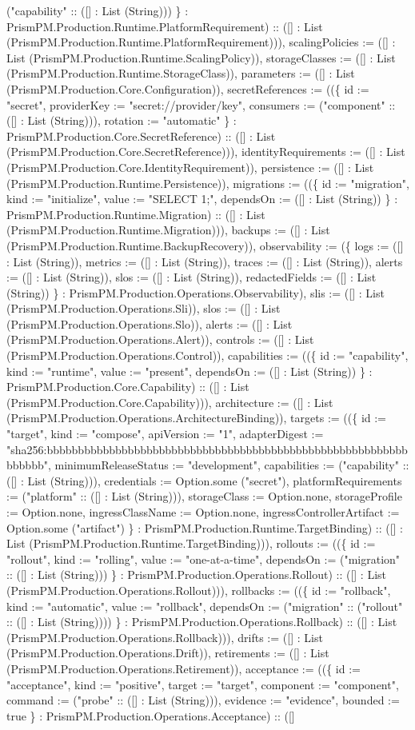 \documentclass[11pt]{article}
\begin{document}
("capability" :: ([] : List (String))) \} : PrismPM.Production.Runtime.PlatformRequirement) :: ([] : List (PrismPM.Production.Runtime.PlatformRequirement))), scalingPolicies := ([] : List (PrismPM.Production.Runtime.ScalingPolicy)), storageClasses := ([] : List (PrismPM.Production.Runtime.StorageClass)), parameters := ([] : List (PrismPM.Production.Core.Configuration)), secretReferences := ((\{ id := "secret", providerKey := "secret://provider/key", consumers := ("component" :: ([] : List (String))), rotation := "automatic" \} : PrismPM.Production.Core.SecretReference) :: ([] : List (PrismPM.Production.Core.SecretReference))), identityRequirements := ([] : List (PrismPM.Production.Core.IdentityRequirement)), persistence := ([] : List (PrismPM.Production.Runtime.Persistence)), migrations := ((\{ id := "migration", kind := "initialize", value := "SELECT 1;", dependsOn := ([] : List (String)) \} : PrismPM.Production.Runtime.Migration) :: ([] : List (PrismPM.Production.Runtime.Migration))), backups := ([] : List (PrismPM.Production.Runtime.BackupRecovery)), observability := (\{ logs := ([] : List (String)), metrics := ([] : List (String)), traces := ([] : List (String)), alerts := ([] : List (String)), slos := ([] : List (String)), redactedFields := ([] : List (String)) \} : PrismPM.Production.Operations.Observability), slis := ([] : List (PrismPM.Production.Operations.Sli)), slos := ([] : List (PrismPM.Production.Operations.Slo)), alerts := ([] : List (PrismPM.Production.Operations.Alert)), controls := ([] : List (PrismPM.Production.Operations.Control)), capabilities := ((\{ id := "capability", kind := "runtime", value := "present", dependsOn := ([] : List (String)) \} : PrismPM.Production.Core.Capability) :: ([] : List (PrismPM.Production.Core.Capability))), architecture := ([] : List (PrismPM.Production.Operations.ArchitectureBinding)), targets := ((\{ id := "target", kind := "compose", apiVersion := "1", adapterDigest := "sha256:bbbbbbbbbbbbbbbbbbbbbbbbbbbbbbbbbbbbbbbbbbbbbbbbbbbbbbbbbbbbbbbb", minimumReleaseStatus := "development", capabilities := ("capability" :: ([] : List (String))), credentials := Option.some ("secret"), platformRequirements := ("platform" :: ([] : List (String))), storageClass := Option.none, storageProfile := Option.none, ingressClassName := Option.none, ingressControllerArtifact := Option.some ("artifact") \} : PrismPM.Production.Runtime.TargetBinding) :: ([] : List (PrismPM.Production.Runtime.TargetBinding))), rollouts := ((\{ id := "rollout", kind := "rolling", value := "one-at-a-time", dependsOn := ("migration" :: ([] : List (String))) \} : PrismPM.Production.Operations.Rollout) :: ([] : List (PrismPM.Production.Operations.Rollout))), rollbacks := ((\{ id := "rollback", kind := "automatic", value := "rollback", dependsOn := ("migration" :: ("rollout" :: ([] : List (String)))) \} : PrismPM.Production.Operations.Rollback) :: ([] : List (PrismPM.Production.Operations.Rollback))), drifts := ([] : List (PrismPM.Production.Operations.Drift)), retirements := ([] : List (PrismPM.Production.Operations.Retirement)), acceptance := ((\{ id := "acceptance", kind := "positive", target := "target", component := "component", command := ("probe" :: ([] : List (String))), evidence := "evidence", bounded := true \} : PrismPM.Production.Operations.Acceptance) :: ([] 
\end{document}
